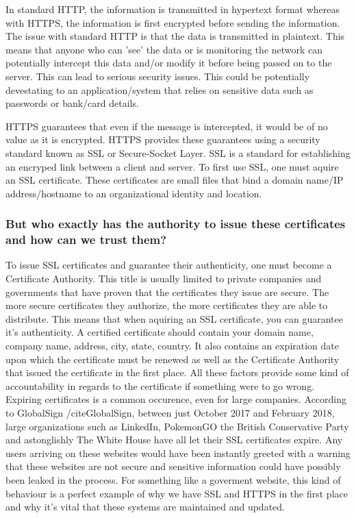     In standard HTTP, the information is transmitted in hypertext format whereas with HTTPS, the information is first encrypted before sending the information.
    The issue with standard HTTP is that the data is transmitted in plaintext. This means that anyone who can 'see' the data or is monitoring the network can potentially intercept this data and/or modify it before being passed on to the server. This can 
    lead to serious security issues. This could be potentially devestating to an application/system that relies on sensitive data such as passwords or bank/card details.

    HTTPS guarantees that even if the message is intercepted, it would be of no value as it is encrypted. HTTPS provides these guarantees using a security standard known as SSL or Secure-Socket Layer.
    SSL is a standard for establishing an encryped link between a client and server. To first use SSL, one must aquire an SSL certificate. These certificates are small files that bind a domain name/IP address/hostname to an organizational identity and location.

    \subsubsection{But who exactly has the authority to issue these certificates and how can we trust them?}
    To issue SSL certificates and guarantee their authenticity, one must become a Certificate Authority. 
    This title is usually limited to private companies and governments that have proven that the certificates they issue are secure. The more secure certificates they authorize, the more certificates they are able to distribute. 
    This means that when aquiring an SSL certificate, you can guarantee it's authenticity. A certified certificate should contain your domain name, company name, address, city, state, country. It also contains an expiration date upon which the certificate must be renewed as well as the Certificate Authority that issued the certificate in the first place.
    All these factors provide some kind of accountability in regards to the certificate if something were to go wrong. Expiring certificates is a common occurence, even for large companies. According to GlobalSign /cite{GlobalSign}, between just October 2017 and February 2018, large organizations such as LinkedIn, PokemonGO the British Conservative Party and astonglishly The White House 
    have all let their SSL certificates expire. Any users arriving on these websites would have been instantly greeted with a warning that these websites are not secure and sensitive information could have possibly been leaked in the process. For something like a goverment website, this kind of behaviour is a perfect example of why we have SSL and HTTPS in the first place and why it's vital that these systems are maintained and updated.

